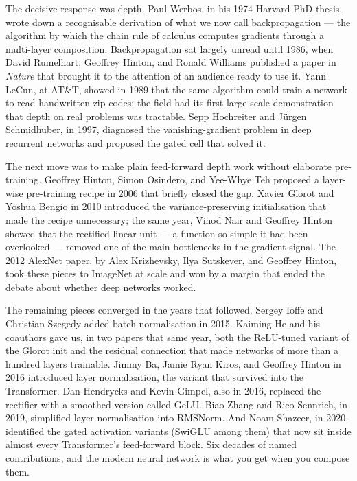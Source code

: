 The decisive response was depth. Paul Werbos, in his 1974 Harvard
PhD thesis, wrote down a recognisable derivation of what we now
call backpropagation --- the algorithm by which the chain rule of
calculus computes gradients through a multi-layer composition.
Backpropagation sat largely unread until 1986, when David
Rumelhart, Geoffrey Hinton, and Ronald Williams published a paper
in \emph{Nature} that brought it to the attention of an audience
ready to use it. Yann LeCun, at AT\&T, showed in 1989 that the
same algorithm could train a network to read handwritten zip
codes; the field had its first large-scale demonstration that
depth on real problems was tractable. Sepp Hochreiter and J\"urgen
Schmidhuber, in 1997, diagnosed the vanishing-gradient problem in
deep recurrent networks and proposed the gated cell that solved
it.

The next move was to make plain feed-forward depth work without
elaborate pre-training. Geoffrey Hinton, Simon Osindero, and
Yee-Whye Teh proposed a layer-wise pre-training recipe in 2006
that briefly closed the gap. Xavier Glorot and Yoshua Bengio in
2010 introduced the variance-preserving initialisation that made
the recipe unnecessary; the same year, Vinod Nair and Geoffrey
Hinton showed that the rectified linear unit --- a function so
simple it had been overlooked --- removed one of the main
bottlenecks in the gradient signal. The 2012 AlexNet paper, by
Alex Krizhevsky, Ilya Sutskever, and Geoffrey Hinton, took these
pieces to ImageNet at scale and won by a margin that ended the
debate about whether deep networks worked.

The remaining pieces converged in the years that followed. Sergey
Ioffe and Christian Szegedy added batch normalisation in 2015.
Kaiming He and his coauthors gave us, in two papers that same year,
both the ReLU-tuned variant of the Glorot init and the residual
connection that made networks of more than a hundred layers
trainable. Jimmy Ba, Jamie Ryan Kiros, and Geoffrey Hinton in 2016
introduced layer normalisation, the variant that survived into
the Transformer. Dan Hendrycks and Kevin Gimpel, also in 2016,
replaced the rectifier with a smoothed version called GeLU. Biao
Zhang and Rico Sennrich, in 2019, simplified layer normalisation
into RMSNorm. And Noam Shazeer, in 2020, identified the gated
activation variants (SwiGLU among them) that now sit inside almost
every Transformer's feed-forward block. Six decades of named
contributions, and the modern neural network is what you get when
you compose them.

